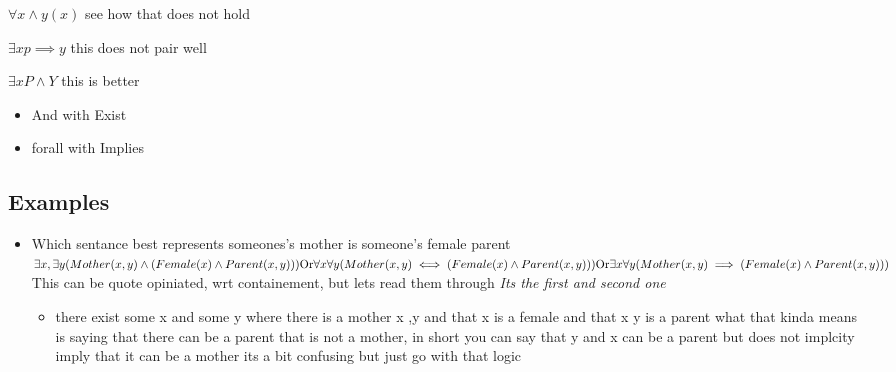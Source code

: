 \documentclass{article}
\theoremstyle{mytheoremstyle}
\theoremstyle{mytheoremstyle}
\theoremstyle{myproblemstyle}
\begin{document}
\begin{math}
	\forall x \land  y(x)
\end{math}
see how that does not hold

\begin{math}
	\exists xp \implies y
\end{math}
this does not pair well

\begin{math}
	\exists  xP \land Y
\end{math}
this is better

\begin{itemize}
	\item And with Exist
	\item forall with Implies
\end{itemize}

\subsection{Examples}
\begin{itemize}
	\item Which sentance best represents someones's mother is someone's female parent
	      \begin{math}
		      \\
		      \exists x, \exists y (Mother(x,y) \land (Female(x) \land Parent(x,y)))
		      \qquad \\
		      \text{Or}
		      \\
		      \forall x \forall y (Mother(x,y) \iff (Female(x) \land Parent(x,y)))
		      \\
		      \text{Or} \\
		      \exists x \forall y(Mother(x,y) \implies (Female(x) \land Parent(x,y)))
	      \end{math}
	      This can be quote opiniated, wrt containement, but lets read them through
	      \textit{Its the first and second one }
	      \begin{itemize}
		      \item there exist some x and some y where there is a mother x ,y and that x is a female and that x y is a parent
		            what that kinda means is saying that there can be a parent that is not a mother, in short you can say that y and x can be a parent but does not implcity imply that it can be a mother
		            its a bit confusing but just go with that logic
	      \end{itemize}
\end{itemize}
\end{document}
